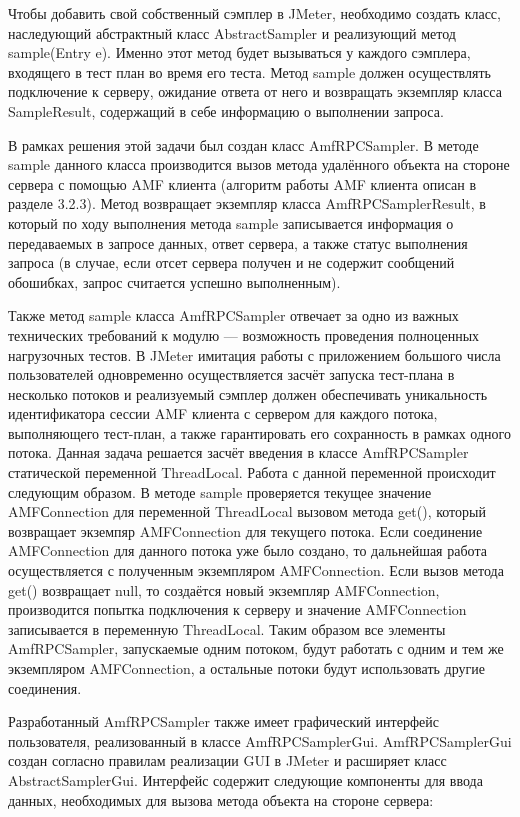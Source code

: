 Чтобы добавить свой собственный сэмплер в JMeter, необходимо создать класс, наследующий абстрактный класс AbstractSampler и 
реализующий метод sample(Entry e). Именно этот метод будет вызываться у каждого сэмплера, входящего в
тест план во время его теста. Метод sample должен осуществлять подключение к серверу, ожидание ответа от него и возвращать
экземпляр класса SampleResult, содержащий в себе информацию о выполнении запроса.

В рамках решения этой задачи был создан класс AmfRPCSampler. В методе sample данного класса производится вызов метода 
удалённого объекта на стороне сервера с помощью AMF клиента (алгоритм работы AMF клиента описан в разделе 3.2.3). 
Метод возвращает экземпляр класса AmfRPCSamplerResult, в который по ходу выполнения метода sample записывается информация 
о передаваемых в запросе данных, ответ сервера, а также статус выполнения запроса (в случае, если отсет сервера получен и 
не содержит сообщений обошибках, запрос считается успешно выполненным).

Также метод sample класса AmfRPCSampler отвечает за одно из важных технических требований к модулю --- возможность проведения 
полноценных нагрузочных тестов. В JMeter имитация работы с приложением большого числа пользователей одновременно осуществляется 
засчёт запуска тест-плана в несколько потоков и реализуемый сэмплер должен обеспечивать уникальность идентификатора сессии AMF 
клиента с сервером для каждого потока, выполняющего тест-план, а также гарантировать его сохранность в рамках одного потока. 
Данная задача решается засчёт введения в классе AmfRPCSampler статической переменной ThreadLocal.
Работа с данной переменной происходит следующим образом. В методе sample проверяется текущее значение AMFСonnection для
переменной ThreadLocal вызовом метода get(), который возвращает экземпяр AMFConnection для текущего потока.
Если соединение AMFConnection для данного потока уже было создано, то дальнейшая работа осуществляется с полученным экземпляром 
AMFConnection. Если вызов метода get() возвращает null, то создаётся новый экземпляр AMFConnection, производится попытка
подключения к серверу и значение AMFConnection записывается в переменную ThreadLocal. Таким образом все элементы AmfRPCSampler,
запускаемые одним потоком, будут работать с одним и тем же экземпляром AMFConnection, а остальные потоки будут использовать другие 
соединения.

Разработанный AmfRPCSampler также имеет графический интерфейс пользователя, реализованный в классе AmfRPCSamplerGui. AmfRPCSamplerGui 
создан согласно правилам реализации GUI в JMeter и расширяет класс AbstractSamplerGui. Интерфейс содержит следующие компоненты для ввода данных, 
необходимых для вызова метода объекта на стороне сервера:

